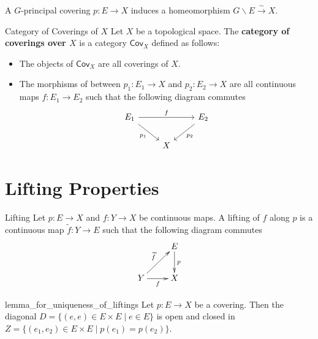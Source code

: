 \documentclass{report}
\begin{document}
\begin{proposition}{}{}
	A $G$-principal covering $p: E \rightarrow X$ induces a homeomorphism $G \backslash E \xrightarrow{\sim} X$.
\end{proposition}

\begin{definition}{Category of Coverings of $X$}{}
	Let $X$ be a topological space. The \textbf{category of coverings over $X$} is a category $\mathsf{Cov}_X$ defined as follows:
	\begin{itemize}
		\item The objects of $\mathsf{Cov}_X$ are all coverings of $X$.
		\item The morphisms of between $p_1:E_1\to X$ and $p_2:E_2\to X$ are all continuous maps $f:E_1\to E_2$ such that the following diagram commutes
		      \begin{equation*}
			      \begin{tikzcd}[ampersand replacement=\&]
				      E_1 \arrow[rr, "f"] \arrow[rd, "p_1"'] \& \& E_2 \arrow[ld, "p_2"] \\
				      \& X \&
			      \end{tikzcd}
		      \end{equation*}
	\end{itemize}
\end{definition}


\section{Lifting Properties}


\begin{definition}{Lifting}{}
	Let $p:E\to X$ and $f:Y\to X$ be continuous maps. A lifting of $f$ along $p$ is a continuous map $\widetilde{f}:Y\to E$ such that the following diagram commutes
	\[\xymatrix{
		& E\ar[d]^{p}\\
		Y\ar[ur]^{\widetilde{f}}\ar[r]_{f} &X
		}\]
\end{definition}




\begin{lemma}{}{lemma_for_uniqueness_of_liftings}
	Let $p: E \rightarrow X$ be a covering. Then the diagonal $D=\{(e, e) \in E \times E \mid e\in E\}$ is open and closed in $Z=\{(e_1, e_2) \in E \times E \mid p(e_1)=p(e_2)\}$.
\end{lemma}
\end{document}
